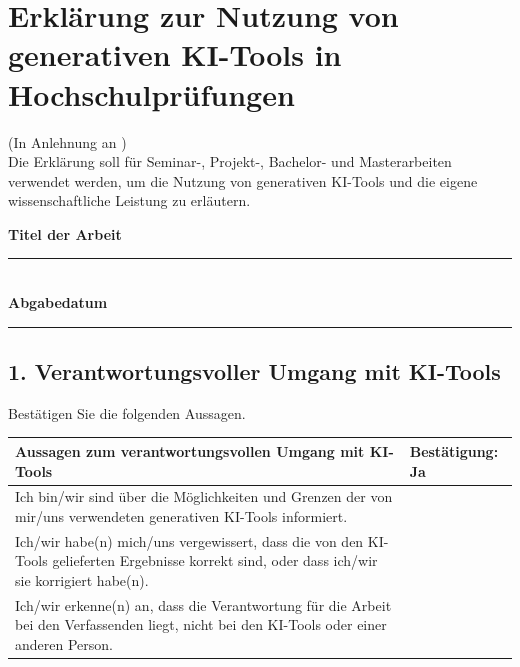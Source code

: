 \keepXColumns
\renewcommand{\theHtable}{ki.\arabic{table}} %
\setlength{\extrarowheight}{2pt}


\section*{Erklärung zur Nutzung von generativen KI-Tools in Hochschulprüfungen}

\noindent
(In Anlehnung an \citealp{gimpel2023kognition})\\[0.5\baselineskip]
Die Erklärung soll für Seminar-, Projekt-, Bachelor- und Masterarbeiten verwendet werden, um die Nutzung von generativen KI-Tools und die eigene wissenschaftliche Leistung zu erläutern.

\vspace{1em}

\noindent
\textbf{Titel der Arbeit} \rule{0.7\textwidth}{0.4pt}\\[0.6\baselineskip]
\textbf{Abgabedatum} \rule{0.7\textwidth}{0.4pt}

\vspace{2em}

\subsection*{1. Verantwortungsvoller Umgang mit KI-Tools}

Bestätigen Sie die folgenden Aussagen.
\begingroup
\small
\begin{tabularx}{\textwidth}{|L|L|}
\hline
\textbf{Aussagen zum verantwortungsvollen Umgang mit KI-Tools} &
\textbf{Bestätigung: Ja} \\
\hline
Ich bin/wir sind über die Möglichkeiten und Grenzen der von mir/uns
verwendeten generativen KI-Tools informiert. &
 \\
\hline
Ich/wir habe(n) mich/uns vergewissert, dass die von den KI-Tools
gelieferten Ergebnisse korrekt sind, oder dass ich/wir sie korrigiert
habe(n). &
 \\
\hline
Ich/wir erkenne(n) an, dass die Verantwortung für die Arbeit bei
den Verfassenden liegt, nicht bei den KI-Tools oder einer anderen
Person. &
 \\
\hline
\end{tabularx}
\endgroup


